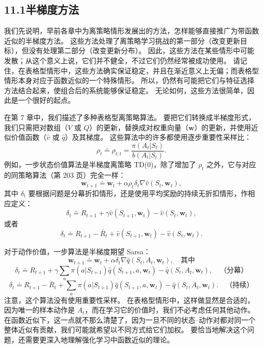 \documentclass[UTF8,12pt,a4paper,fontset=fandol]{ctexart}
\begin{document}
\subsection*{11.1\quad 半梯度方法}

我们先说明，早前各章中为离策略情形发展出的方法，怎样能够直接推广为带函数近似的半梯度方法。
这些方法处理了离策略学习挑战的第一部分（改变更新目标），但没有处理第二部分（改变更新分布）。
因此，这些方法在某些情形中可能发散；从这个意义上说，它们并不健全，不过它们仍然经常被成功使用。
请记住，在表格型情形中，这些方法确实保证稳定，并且在渐近意义上无偏；而表格型情形本身对应于函数近似的一个特殊情形。
所以，仍然有可能把它们与特征选择方法结合起来，使组合后的系统能够保证稳定。
无论如何，这些方法很简单，因此是一个很好的起点。

在第 7 章中，我们描述了多种表格型离策略算法。
要把它们转换成半梯度形式，我们只需把对数组（$V$ 或 $Q$）的更新，替换成对权重向量（$\mathbf{w}$）的更新，并使用近似价值函数（$\hat v$ 或 $\hat q$）及其梯度。
这些算法中的许多都使用逐步重要性采样比：
\begin{equation}
\rho_t\doteq\rho_{t:t}=\frac{\pi(A_t|S_t)}{b(A_t|S_t)}.
\tag{11.1}
\end{equation}
例如，一步状态价值算法是半梯度离策略 TD(0)，除了增加了 $\rho_t$ 之外，它与对应的同策略算法（第 203 页）完全一样：
\begin{equation}
\mathbf{w}_{t+1}\doteq \mathbf{w}_t+\alpha\rho_t\delta_t\nabla\hat v(S_t,\mathbf{w}_t),
\tag{11.2}
\end{equation}
其中 $\delta_t$ 要根据问题是分幕折扣情形，还是使用平均奖励的持续无折扣情形，作相应定义：
\begin{equation}
\delta_t\doteq R_{t+1}+\gamma\hat v(S_{t+1},\mathbf{w}_t)-\hat v(S_t,\mathbf{w}_t),
\tag{11.3}
\end{equation}
或者
\begin{equation}
\delta_t\doteq R_{t+1}-\bar R_t+\hat v(S_{t+1},\mathbf{w}_t)-\hat v(S_t,\mathbf{w}_t).
\tag{11.4}
\end{equation}

对于动作价值，一步算法是半梯度期望 Sarsa：
\begin{equation}
\mathbf{w}_{t+1}\doteq \mathbf{w}_t+\alpha\delta_t\nabla\hat q(S_t,A_t,\mathbf{w}_t),
\quad\text{其中}
\tag{11.5}
\end{equation}
\[
\delta_t\doteq R_{t+1}+\gamma\sum_a\pi(a|S_{t+1})\hat q(S_{t+1},a,\mathbf{w}_t)-\hat q(S_t,A_t,\mathbf{w}_t),
\quad \text{（分幕）}
\]
\[
\delta_t\doteq R_{t+1}-\bar R_t+\sum_a\pi(a|S_{t+1})\hat q(S_{t+1},a,\mathbf{w}_t)-\hat q(S_t,A_t,\mathbf{w}_t).
\quad \text{（持续）}
\]
注意，这个算法没有使用重要性采样。
在表格型情形中，这样做显然是合适的，因为唯一的样本动作是 $A_t$，而在学习它的价值时，我们不必考虑任何其他动作。
在函数近似下，这一点就不那么清楚了，因为一旦不同的状态--动作对都对同一个整体近似有贡献，我们可能就希望以不同方式给它们加权。
要恰当地解决这个问题，还需要更深入地理解强化学习中函数近似的理论。
\end{document}
